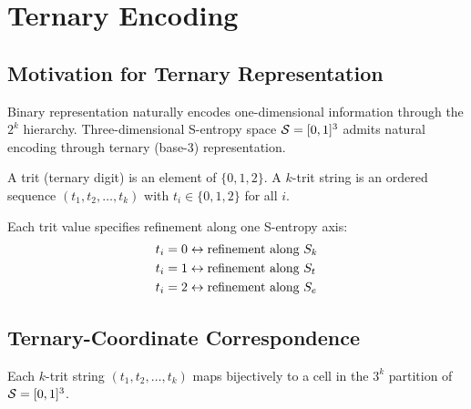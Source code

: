 \section{Ternary Encoding}
\label{sec:ternary}

\subsection{Motivation for Ternary Representation}

Binary representation naturally encodes one-dimensional information through the $2^k$ hierarchy. Three-dimensional S-entropy space $\mathcal{S} = [0,1]^3$ admits natural encoding through ternary (base-3) representation.

\begin{definition}[Trit]
\label{def:trit}
A trit (ternary digit) is an element of $\{0,1,2\}$. A $k$-trit string is an ordered sequence $(t_1, t_2, \ldots, t_k)$ with $t_i \in \{0,1,2\}$ for all $i$.
\end{definition}

\begin{definition}
\label{def:trit_interpretation}
Each trit value specifies refinement along one S-entropy axis:
\begin{align}
t_i = 0 &\leftrightarrow \text{refinement along } S_k \label{eq:trit_0} \\
t_i = 1 &\leftrightarrow \text{refinement along } S_t \label{eq:trit_1} \\
t_i = 2 &\leftrightarrow \text{refinement along } S_e \label{eq:trit_2}
\end{align}
\end{definition}

\subsection{Ternary-Coordinate Correspondence}

\begin{theorem}
\label{thm:ternary_correspondence}
Each $k$-trit string $(t_1,t_2,\ldots,t_k)$ maps bijectively to a cell in the $3^k$ partition of $\mathcal{S} = [0,1]^3$.
\end{theorem}

